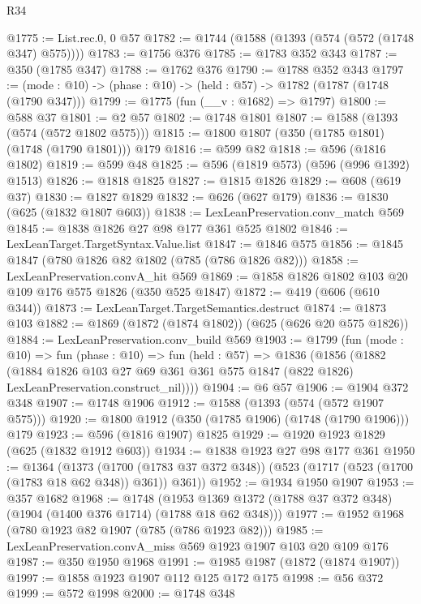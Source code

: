 \begin{lexlean}{R34}
\begin{coremodule}
@1775 := List.rec.{0, 0} @57
@1782 := @1744 (@1588 (@1393 (@574 (@572 (@1748 @347) @575))))
@1783 := @1756 @376
@1785 := @1783 @352 @343
@1787 := @350 (@1785 @347)
@1788 := @1762 @376
@1790 := @1788 @352 @343
@1797 := (mode : @10) -> (phase : @10) -> (held : @57) -> @1782 (@1787 (@1748 (@1790 @347)))
@1799 := @1775 (fun (__v : @1682) => @1797)
@1800 := @588 @37
@1801 := @2 @57
@1802 := @1748 @1801
@1807 := @1588 (@1393 (@574 (@572 @1802 @575)))
@1815 := @1800 @1807 (@350 (@1785 @1801) (@1748 (@1790 @1801))) @179
@1816 := @599 @82
@1818 := @596 (@1816 @1802)
@1819 := @599 @48
@1825 := @596 (@1819 @573) (@596 (@996 @1392) @1513)
@1826 := @1818 @1825
@1827 := @1815 @1826
@1829 := @608 (@619 @37)
@1830 := @1827 @1829
@1832 := @626 (@627 @179)
@1836 := @1830 (@625 (@1832 @1807 @603))
@1838 := LexLeanPreservation.conv_match @569
@1845 := @1838 @1826 @27 @98 @177 @361 @525 @1802
@1846 := LexLeanTarget.TargetSyntax.Value.list
@1847 := @1846 @575
@1856 := @1845 @1847 (@780 @1826 @82 @1802 (@785 (@786 @1826 @82)))
@1858 := LexLeanPreservation.convA_hit @569
@1869 := @1858 @1826 @1802 @103 @20 @109 @176 @575 @1826 (@350 @525 @1847)
@1872 := @419 (@606 (@610 @344))
@1873 := LexLeanTarget.TargetSemantics.destruct
@1874 := @1873 @103
@1882 := @1869 (@1872 (@1874 @1802)) (@625 (@626 @20 @575 @1826))
@1884 := LexLeanPreservation.conv_build @569
@1903 := @1799
    (fun (mode : @10) =>
    fun (phase : @10) =>
    fun (held : @57) =>
    @1836
      (@1856
        (@1882
          (@1884
            @1826
            @103
            @27
            @69
            @361
            @361
            @575
            @1847
            (@822 @1826)
            LexLeanPreservation.construct_nil))))
@1904 := @6 @57
@1906 := @1904 @372 @348
@1907 := @1748 @1906
@1912 := @1588 (@1393 (@574 (@572 @1907 @575)))
@1920 := @1800 @1912 (@350 (@1785 @1906) (@1748 (@1790 @1906))) @179
@1923 := @596 (@1816 @1907) @1825
@1929 := @1920 @1923 @1829 (@625 (@1832 @1912 @603))
@1934 := @1838 @1923 @27 @98 @177 @361
@1950 := @1364
    (@1373
      (@1700 (@1783 @37 @372 @348))
      (@523 (@1717 (@523 (@1700 (@1783 @18 @62 @348)) @361)) @361))
@1952 := @1934 @1950 @1907
@1953 := @357 @1682
@1968 := @1748
    (@1953 @1369 @1372 (@1788 @37 @372 @348) (@1904 (@1400 @376 @1714) (@1788 @18 @62 @348)))
@1977 := @1952 @1968 (@780 @1923 @82 @1907 (@785 (@786 @1923 @82)))
@1985 := LexLeanPreservation.convA_miss @569 @1923 @1907 @103 @20 @109 @176
@1987 := @350 @1950 @1968
@1991 := @1985 @1987 (@1872 (@1874 @1907))
@1997 := @1858 @1923 @1907 @112 @125 @172 @175
@1998 := @56 @372
@1999 := @572 @1998
@2000 := @1748 @348

\end{coremodule}
\end{lexlean}
